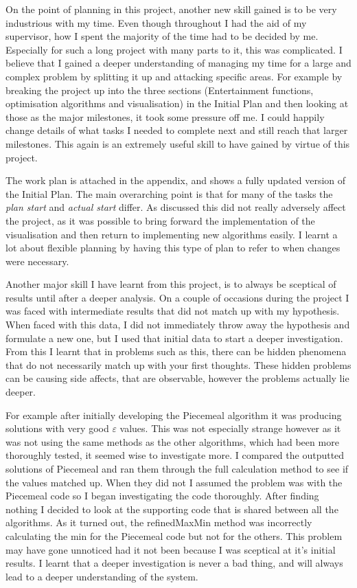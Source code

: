 \documentclass[12pt]{report}
\begin{document}
On the point of planning in this project, another new skill gained is to be very industrious with my time. Even though throughout I had the aid of my supervisor, how I spent the majority of the time had to be decided by me. Especially for such a long project with many parts to it, this was complicated. I believe that I gained a deeper understanding of managing my time for a large and complex problem by splitting it up and attacking specific areas. For example by breaking the project up into the three sections (Entertainment functions, optimisation algorithms and visualisation) in the Initial Plan and then looking at those as the major milestones, it took some pressure off me. I could happily change details of what tasks I needed to complete next and still reach that larger milestones. This again is an extremely useful skill to have gained by virtue of this project.

The work plan is attached in the appendix, and shows a fully updated version of the Initial Plan. The main overarching point is that for many of the tasks the \textit{plan start} and \textit{actual start} differ. As discussed this did not really adversely affect the project, as it was possible to bring forward the implementation of the visualisation and then return to implementing new algorithms easily. I learnt a lot about flexible planning by having this type of plan to refer to when changes were necessary.

Another major skill I have learnt from this project, is to always be sceptical of results until after a deeper analysis. On a couple of occasions during the project I was faced with intermediate results that did not match up with my hypothesis. When faced with this data, I did not immediately throw away the hypothesis and formulate a new one, but I used that initial data to start a deeper investigation. From this I learnt that in problems such as this, there can be hidden phenomena that do not necessarily match up with your first thoughts. These hidden problems can be causing side affects, that are observable, however the problems actually lie deeper. 

For example after initially developing the Piecemeal algorithm it was producing solutions with very good $\varepsilon$ values. This was not especially strange however as it was not using the same methods as the other algorithms, which had been more thoroughly tested, it seemed wise to investigate more. I compared the outputted solutions of Piecemeal and ran them through the full calculation method to see if the values matched up. When they did not I assumed the problem was with the Piecemeal code so I began investigating the code thoroughly. After finding nothing I decided to look at the supporting code that is shared between all the algorithms. As it turned out, the refinedMaxMin method was incorrectly calculating the min for the Piecemeal code but not for the others. This problem may have gone unnoticed had it not been because I was sceptical at it's initial results. I learnt that a deeper investigation is never a bad thing, and will always lead to a deeper understanding of the system.
\end{document}

